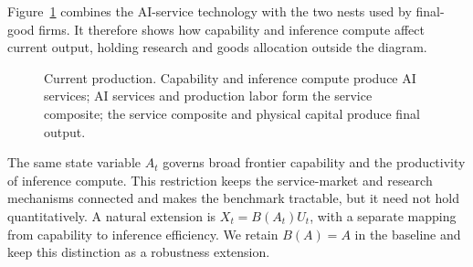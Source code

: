 Figure~\ref{fig:current-production-flow} combines the AI-service technology with the
two nests used by final-good firms. It therefore shows how capability and inference
compute affect current output, holding research and goods allocation outside the
diagram.

\begin{figure}[H]
    \centering
    \caption{Current production. Capability and inference compute produce AI
    services; AI services and production labor form the service composite; the
    service composite and physical capital produce final output.}
    \label{fig:current-production-flow}
\end{figure}

\begin{remark}
The same state variable $A_t$ governs broad frontier capability and the productivity
of inference compute. This restriction keeps the service-market and research
mechanisms connected and makes the benchmark tractable, but it need not hold
quantitatively. A natural extension is $X_t=B(A_t)U_t$, with a separate mapping from
capability to inference efficiency. We retain $B(A)=A$ in the baseline and keep this
distinction as a robustness extension.
\end{remark}

